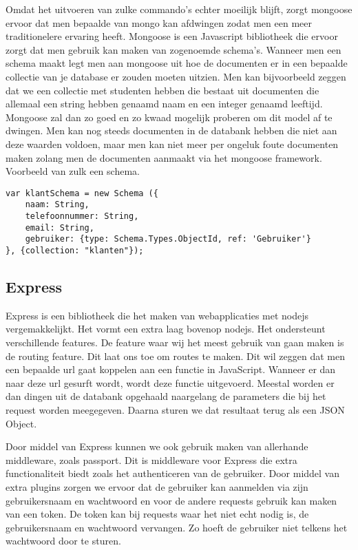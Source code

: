 \documentclass[a4paper,11pt]{article}
\begin{document}
Omdat het uitvoeren van zulke commando's echter moeilijk blijft, zorgt mongoose ervoor dat men bepaalde van mongo kan afdwingen zodat men een meer traditionelere ervaring heeft. Mongoose is een Javascript bibliotheek die ervoor zorgt dat men gebruik kan maken van zogenoemde schema's. Wanneer men een schema maakt legt men aan mongoose uit hoe de documenten er in een bepaalde collectie van je database er zouden moeten uitzien. Men kan bijvoorbeeld zeggen dat we een collectie met studenten hebben die bestaat uit documenten die allemaal een string hebben genaamd naam en een integer genaamd leeftijd. Mongoose zal dan zo goed en zo kwaad mogelijk proberen om dit model af te dwingen. Men kan nog steeds documenten in de databank hebben die niet aan deze waarden voldoen, maar men kan niet meer per ongeluk foute documenten maken zolang men de documenten aanmaakt via het mongoose framework. Voorbeeld van zulk een schema.
\begin{lstlisting}
var klantSchema = new Schema ({
	naam: String,
	telefoonnummer: String,
	email: String,
	gebruiker: {type: Schema.Types.ObjectId, ref: 'Gebruiker'}
}, {collection: "klanten"});
\end{lstlisting}

\subsection{Express}
Express is een bibliotheek die het maken van webapplicaties met nodejs vergemakkelijkt. Het vormt een extra laag bovenop nodejs. Het ondersteunt verschillende features. De feature waar wij het meest gebruik van gaan maken is de routing feature. Dit laat ons toe om routes te maken. Dit wil zeggen dat men een bepaalde url gaat koppelen aan een functie in JavaScript. Wanneer er dan naar deze url gesurft wordt, wordt deze functie uitgevoerd. Meestal worden er dan dingen uit de databank opgehaald naargelang de parameters die bij het request worden meegegeven. Daarna sturen we dat resultaat terug als een JSON Object.

Door middel van Express kunnen we ook gebruik maken van allerhande middleware, zoals passport. Dit is middleware voor Express die extra functionaliteit biedt zoals het authenticeren van de gebruiker. Door middel van extra plugins zorgen we ervoor dat de gebruiker kan aanmelden via zijn gebruikersnaam en wachtwoord en voor de andere requests gebruik kan maken van een token. De token kan bij requests waar het niet echt nodig is, de gebruikersnaam en wachtwoord vervangen. Zo hoeft de gebruiker niet telkens het wachtwoord door te sturen.
\end{document}
